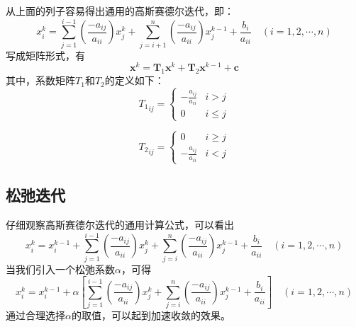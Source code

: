 从上面的列子容易得出通用的高斯赛德尔迭代，即：
\begin{equation}
  x_{i}^{k}
  =
  \sum_{j=1}^{i-1}
  \left(
    \frac{-a_{ij}}{a_{ii}}
  \right)
  x_{j}^{k}
  +
  \sum_{j=i+1}^{n}
  \left(
    \frac{-a_{ij}}{a_{ii}}
  \right)
  x_{j}^{k-1}
  +
  \frac{b_{i}}{a_{ii}}
  \quad
  (i=1,2,\cdots,n)
\end{equation}
写成矩阵形式，有
\begin{equation}
  \mathbf{x}^{k} 
  =
  \mathbf{T}_{1}\mathbf{x}^{k}
  +
  \mathbf{T}_{2}\mathbf{x}^{k-1}
  +
  \mathbf{c}
\end{equation}
其中，系数矩阵$T_{1}$和$T_{2}$的定义如下：
\begin{equation}
  {T_{1}}_{ij} 
  =
  \begin{cases}
    \displaystyle
    -\frac{a_{ij}}{a_{ii}} & i>j \\
    0 & i\le j
  \end{cases}
\end{equation}

\begin{equation}
  {T_{2}}_{ij} 
  =
  \begin{cases}
    0 & i\ge j
    \\
    \displaystyle
    -\frac{a_{ij}}{a_{ii}} & i<j 
  \end{cases}
\end{equation}

\subsection{松弛迭代}
仔细观察高斯赛德尔迭代的通用计算公式，可以看出
\begin{equation}
  x_{i}^{k}
  =
  x_{i}^{k-1}
  +
  \sum_{j=1}^{i-1}
  \left(
    \frac{-a_{ij}}{a_{ii}}
  \right)
  x_{j}^{k}
  +
  \sum_{j=i}^{n}
  \left(
    \frac{-a_{ij}}{a_{ii}}
  \right)
  x_{j}^{k-1}
  +
  \frac{b_{i}}{a_{ii}}
  \quad
  (i=1,2,\cdots,n)
\end{equation}
当我们引入一个松弛系数$\alpha$，可得
\begin{equation}
  x_{i}^{k}
  =
  x_{i}^{k-1}
  +
  \alpha
  \left[
  \sum_{j=1}^{i-1}
  \left(
    \frac{-a_{ij}}{a_{ii}}
  \right)
  x_{j}^{k}
  +
  \sum_{j=i}^{n}
  \left(
    \frac{-a_{ij}}{a_{ii}}
  \right)
  x_{j}^{k-1}
  +
  \frac{b_{i}}{a_{ii}}
    \right]
  \quad
  (i=1,2,\cdots,n)
\end{equation}
通过合理选择$\alpha$的取值，可以起到加速收敛的效果。

